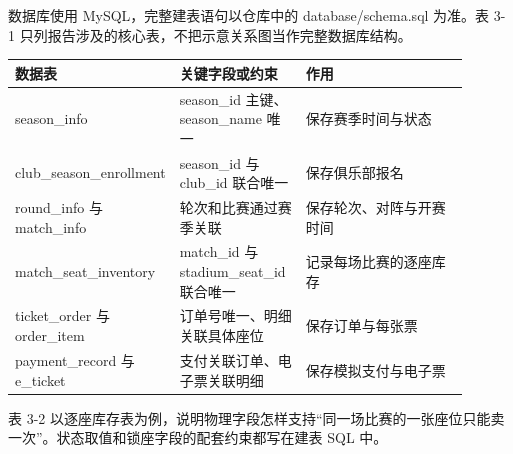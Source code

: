 \documentclass[UTF8,zihao=-4,a4paper]{ctexart}
\begin{document}
数据库使用 MySQL，完整建表语句以仓库中的 database/schema.sql 为准。表 3-1 只列报告涉及的核心表，不把示意关系图当作完整数据库结构。


\begin{longtable}{@{}>{\raggedright\arraybackslash}p{0.22\linewidth}>{\raggedright\arraybackslash}p{0.28\linewidth}>{\raggedright\arraybackslash}p{0.4\linewidth}@{}}\toprule

\textbf{数据表} & \textbf{关键字段或约束} & \textbf{作用} \\\midrule

season\_\allowbreak{}info & season\_\allowbreak{}id 主键、season\_\allowbreak{}name 唯一 & 保存赛季时间与状态 \\

club\_\allowbreak{}season\_\allowbreak{}enrollment & season\_\allowbreak{}id 与 club\_\allowbreak{}id 联合唯一 & 保存俱乐部报名 \\

round\_\allowbreak{}info 与 match\_\allowbreak{}info & 轮次和比赛通过赛季关联 & 保存轮次、对阵与开赛时间 \\

match\_\allowbreak{}seat\_\allowbreak{}inventory & match\_\allowbreak{}id 与 stadium\_\allowbreak{}seat\_\allowbreak{}id 联合唯一 & 记录每场比赛的逐座库存 \\

ticket\_\allowbreak{}order 与 order\_\allowbreak{}item & 订单号唯一、明细关联具体座位 & 保存订单与每张票 \\

payment\_\allowbreak{}record 与 e\_\allowbreak{}ticket & 支付关联订单、电子票关联明细 & 保存模拟支付与电子票 \\

\bottomrule\end{longtable}

表 3-2 以逐座库存表为例，说明物理字段怎样支持“同一场比赛的一张座位只能卖一次”。状态取值和锁座字段的配套约束都写在建表 SQL 中。
\end{document}
